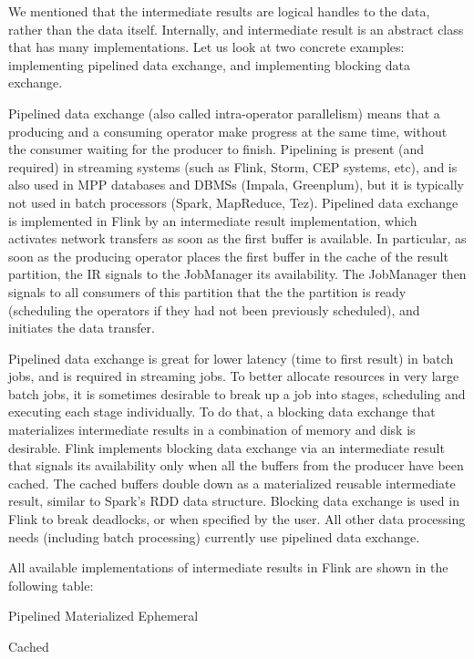 \documentclass{sig-alternate}
\begin{document}
We mentioned that the intermediate results are logical handles to the data, rather than the data itself. Internally, and intermediate result is an abstract class that has many implementations. Let us look at two concrete examples: implementing pipelined data exchange, and implementing blocking data exchange.

Pipelined data exchange (also called intra-operator parallelism) means that a producing and a consuming operator make progress at the same time, without the consumer waiting for the producer to finish. Pipelining is present (and required) in streaming systems (such as Flink, Storm, CEP systems, etc), and is also used in MPP databases and DBMSs (Impala, Greenplum), but it is typically not used in batch processors (Spark, MapReduce, Tez). Pipelined data exchange is implemented in Flink by an intermediate result implementation, which activates network transfers as soon as the first buffer is available. In particular, as soon as the producing operator places the first buffer in the cache of the result partition, the IR signals to the JobManager its availability. The JobManager then signals to all consumers of this partition that the the partition is ready (scheduling the operators if they had not been previously scheduled), and initiates the data transfer.

Pipelined data exchange is great for lower latency (time to first result) in batch jobs, and is required in streaming jobs. To better allocate resources in very large batch jobs, it is sometimes desirable to break up a job into stages, scheduling and executing each stage individually. To do that, a blocking data exchange that materializes intermediate results in a combination of memory and disk is desirable. Flink implements blocking data exchange via an intermediate result that signals its availability only when all the buffers from the producer have been cached. The cached buffers double down as a materialized reusable intermediate result, similar to Spark’s RDD data structure. Blocking data exchange is used in Flink to break deadlocks, or when specified by the user. All other data processing needs (including batch processing) currently use pipelined data exchange.

All available implementations of intermediate results in Flink are shown in the following table:



Pipelined
Materialized
Ephemeral




Cached
\end{document}
